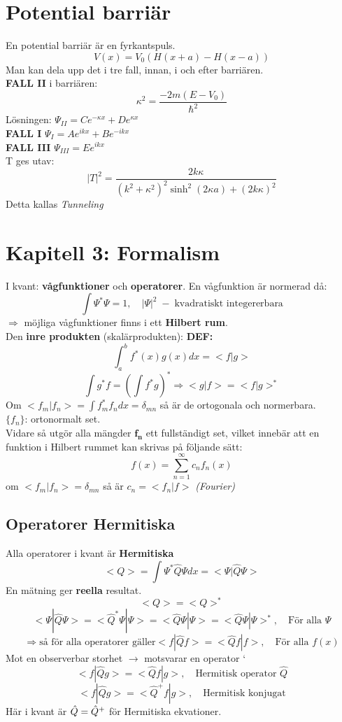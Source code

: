 \documentclass{article}
\begin{document}
\section{Potential barriär}
  En potential barriär är en fyrkantspuls.
  \[
    V(x) = V_0(H(x+a)-H(x-a))
  \]
  Man kan dela upp det i tre fall, innan, i och efter barriären.\\

  \textbf{FALL II} i barriären:
  \[
    \kappa^2 = \frac{-2m(E-V_0)}{\hbar^2}
  \]
Lösningen: $\Psi_{II}=Ce^{-\kappa x}+De^{\kappa x}$\\

\textbf{FALL I} $\Psi_I=Ae^{ikx}+Be^{-ikx}$\\

\textbf{FALL III} $\Psi_{III}=Ee^{ikx}$\\

T ges utav:
\[
  |T|^2=\frac{2k\kappa}{(k^2+\kappa^2)^2\sinh^2{(2\kappa a)}+(2k\kappa)^2}
\]
Detta kallas \textit{Tunneling}

\newpage
\section*{ Kapitell 3: Formalism}
  I kvant: \textbf{vågfunktioner} och \textbf{operatorer}. En vågfunktion är normerad då:
  \[
    \int \Psi^*\Psi=1,\quad |\Psi|^2\;-\;\text{kvadratiskt integererbara}
  \]
  $\Rightarrow$ möjliga vågfunktioner finns i ett \textbf{Hilbert rum}.\\

  Den \textbf{inre produkten} (skalärprodukten):
  \textbf{DEF:}
  \[
    \int_a^b f^*(x)g(x)dx = <f|g>
  \]
  \[
    \int g^*f=(\int f^*g)^*\Longrightarrow<g|f>=<f|g>^*
  \]
  Om $<f_m|f_n>=\int f_m^*f_ndx=\delta_{mn}$ så är de ortogonala och normerbara.\\
  $\{f_n\}$: ortonormalt set.\\

  Vidare så utgör alla mängder $\mathbf{f_n}$ ett fullständigt set, vilket innebär att en funktion i Hilbert rummet kan skrivas på följande sätt:
  \[
    f(x)=\sum_{n=1}^{\infty}c_nf_n(x)
  \]
  om $<f_m|f_n>=\delta_{mn}$ så är $c_n=<f_n|f>$ \textit{(Fourier)}

  \subsection*{Operatorer \textbf{Hermitiska}}
    Alla operatorer i kvant är \textbf{Hermitiska}
    \[
      <Q>=\int\Psi^*\hat{Q}\Psi dx=<\Psi|\hat{Q}\Psi>
    \]
    En mätning ger \textbf{reella} resultat.
    \[
      <Q>=<Q>^*
    \]
    \[
      <\Psi|\hat{Q}\Psi>=<\hat{Q}^*\Psi|\Psi>=<\hat{Q}\Psi|\Psi>=<\hat{Q}\Psi|\Psi>^*,\quad\text{För alla }\Psi
    \]
    \[
      \Longrightarrow\text{så för alla operatorer gäller} <f|\hat{Q}f>=<\hat{Q}f|f>,\quad\text{För alla }f(x)
    \]
    Mot en observerbar storhet $\rightarrow$ motsvarar en operator `
    \[
      <f|\hat{Q}g>=<\hat{Q}f|g>,\quad\text{Hermitisk operator }\hat{Q}
    \]
    \[
      <f|\hat{Q}g>=<\hat{Q}^+f|g>,\quad\text{Hermitisk konjugat}
    \]
    Här i kvant är $\Hat{Q}=\hat{Q}^+$ för Hermitiska ekvationer.
\end{document}
